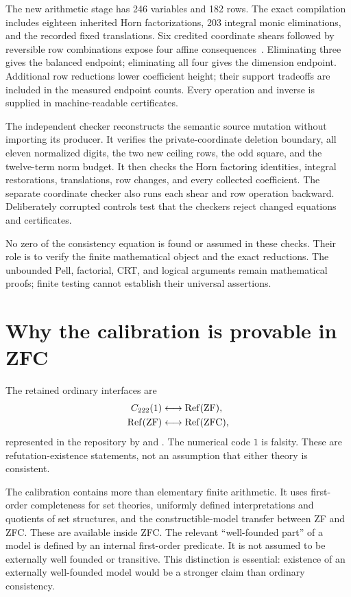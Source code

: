 \documentclass[11pt,letterpaper]{article}
\theoremstyle{remark}\newtheorem{remark}[theorem]{Remark}
\newcommand{\Refut}{\operatorname{Ref}}\newcommand{\PellX}{\mathsf X}\newcommand{\PellY}{\mathsf Y}
\begin{document}
The new arithmetic stage has 246 variables and 182 rows. The exact compilation includes eighteen inherited Horn factorizations, 203 integral monic eliminations, and the recorded fixed translations. Six credited coordinate shears followed by reversible row combinations expose four affine consequences~\cite{residual}. Eliminating three gives the balanced endpoint; eliminating all four gives the dimension endpoint. Additional row reductions lower coefficient height; their support tradeoffs are included in the measured endpoint counts. Every operation and inverse is supplied in machine-readable certificates.

The independent checker reconstructs the semantic source mutation without importing its producer. It verifies the private-coordinate deletion boundary, all eleven normalized digits, the two new ceiling rows, the odd square, and the twelve-term norm budget. It then checks the Horn factoring identities, integral restorations, translations, row changes, and every collected coefficient. The separate coordinate checker also runs each shear and row operation backward. Deliberately corrupted controls test that the checkers reject changed equations and certificates.

No zero of the consistency equation is found or assumed in these checks. Their role is to verify the finite mathematical object and the exact reductions. The unbounded Pell, factorial, CRT, and logical arguments remain mathematical proofs; finite testing cannot establish their universal assertions.



\section{Why the calibration is provable in ZFC}
\label{sec:calibration}
The retained ordinary interfaces are
\begin{align*}
 C_{222}(1)&\longleftrightarrow \Refut(\mathrm{ZF}),\\
 \Refut(\mathrm{ZF})&\longleftrightarrow\Refut(\ZFC),
\end{align*}
represented in the repository by
 and
.
The numerical code $1$ is falsity. These are refutation-existence statements, not an assumption that either theory is consistent.

The calibration contains more than elementary finite arithmetic. It uses first-order completeness for set theories, uniformly defined interpretations and quotients of set structures, and the constructible-model transfer between ZF and ZFC. These are available inside ZFC. The relevant ``well-founded part'' of a model is defined by an internal first-order predicate. It is not assumed to be externally well founded or transitive. This distinction is essential: existence of an externally well-founded model would be a stronger claim than ordinary consistency.
\end{document}
